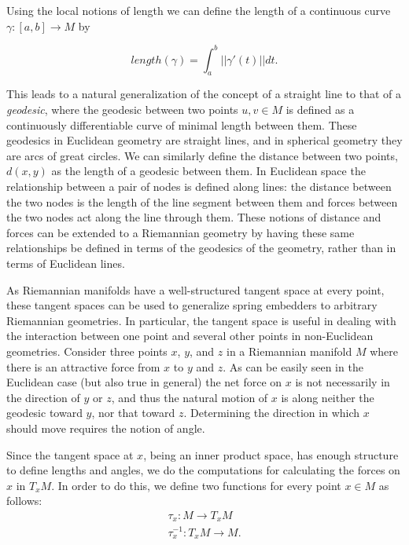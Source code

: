 \documentclass[notitlepage,letter,11pt]{article}
\newcommand{\fcn}[3]{\ensuremath{#1 : #2 \rightarrow #3}}
\begin{document}
Using the local notions of length we can define the length of a
continuous curve $\gamma : [a,b] \rightarrow M$ by

\begin{equation*}
    length(\gamma) = \int_a^b || \gamma'(t) || dt.
\end{equation*}

This leads to a natural generalization of the concept of a straight
line to that of a {\em geodesic}, where the geodesic between two
points $u,v\in M$ is defined as a continuously differentiable curve of
minimal length between them.  These geodesics in Euclidean geometry
are straight lines, and in spherical geometry they are arcs of great
circles.  We can similarly define the distance between two points,
$d(x,y)$ as the length of a geodesic between them. In Euclidean space
the relationship between a pair of nodes is defined along lines: the
distance between the two nodes is the length of the line segment
between them and forces between the two nodes act along the line
through them.  These notions of distance and forces can be extended to
a Riemannian geometry by having these same relationships be defined in
terms of the geodesics of the geometry, rather than in terms of
Euclidean lines.

As Riemannian manifolds have a well-structured tangent space at every
point, these tangent spaces can be used to generalize spring embedders
to arbitrary Riemannian geometries. In particular, the tangent space
is useful in dealing with the interaction between one point and
several other points in non-Euclidean geometries.  Consider three
points $x$, $y$, and $z$ in a Riemannian manifold $M$ where there is
an attractive force from $x$ to $y$ and $z$. As can be easily seen in
the Euclidean case (but also true in general) the net force on $x$ is
not necessarily in the direction of $y$ or $z$, and thus the natural
motion of $x$ is along neither the geodesic toward $y$, nor that
toward $z$. Determining the direction in which $x$ should move
requires the notion of angle.

Since the tangent space at $x$, being an inner product space, has
enough structure to define lengths and angles, we do the computations
for calculating the forces on $x$ in $T_x M$.  In order to do this, we
define two functions for every point $x \in M$ as follows:
\begin{eqnarray*}
 \fcn{\tau_x}{M}{T_x M} \\
 \fcn{\tau_x^{-1}}{T_x M}{M}.
 \end{eqnarray*}
\end{document}
